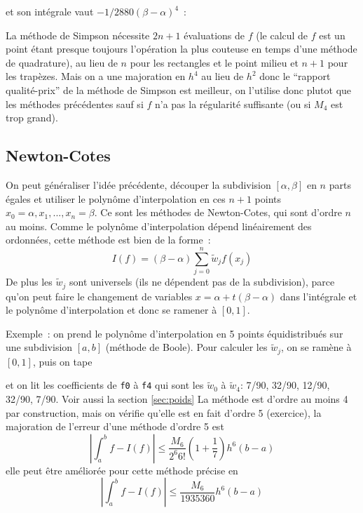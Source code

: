 \documentclass[a4paper,11pt]{article}
\begin{document}
\begin{giacjshere}
et son int\'egrale vaut $-1/2880(\beta-\alpha)^4$~:\\

La m\'ethode de Simpson n\'ecessite $2n+1$ \'evaluations de $f$ (le calcul
de $f$ est un point \'etant presque toujours 
l'op\'eration la plus couteuse en temps d'une
m\'ethode de quadrature), au lieu de $n$ pour les rectangles
et le point milieu et $n+1$ pour les trap\`ezes. Mais on a une majoration
en $h^4$ au lieu de $h^2$ donc le ``rapport qualit\'e-prix'' de la m\'ethode
de Simpson est meilleur, on l'utilise donc plutot que les
m\'ethodes pr\'ec\'edentes sauf si $f$ n'a pas la r\'egularit\'e
suffisante (ou si $M_4$ est trop grand).

 \subsection{Newton-Cotes} 
On peut g\'en\'eraliser l'id\'ee pr\'ec\'edente, d\'ecouper la subdivision 
$[\alpha,\beta]$ en $n$ parts \'egales et utiliser le polynôme d'interpolation
en ces $n+1$ points $x_0=\alpha, x_1, ..., x_n=\beta$. 
Ce sont les m\'ethodes de Newton-Cotes,
qui sont d'ordre $n$ au moins. Comme le polyn\^ome d'interpolation
d\'epend lin\'eairement des ordonn\'ees, cette m\'ethode est bien
de la forme~:
\[ I(f)=(\beta-\alpha)\sum_{j=0}^n \tilde{w}_j f(x_j)\]
De plus les $\tilde{w}_j$ sont universels (ils ne d\'ependent pas de 
la subdivision), parce qu'on peut faire 
le changement de variables $x=\alpha+t(\beta-\alpha)$ dans l'int\'egrale
et le polyn\^ome d'interpolation et donc se ramener \`a $[0,1]$.

Exemple~: on prend le polyn\^ome d'interpolation en 5 points 
\'equidistribu\'es sur une subdivision $[a,b]$ (m\'ethode de Boole). 
Pour calculer les
$\tilde{w}_j$, on se ram\`ene \`a $[0,1]$, puis on tape
\begin{center}
\end{center}
et on lit les coefficients de \verb|f0| \`a \verb|f4|
qui sont les $\tilde{w}_0$ \`a  $\tilde{w}_4$: 7/90, 32/90, 12/90,
32/90, 7/90. Voir aussi la section \ref{sec:poids}
La m\'ethode est d'ordre au moins 4 par construction, mais on v\'erifie
qu'elle est en fait d'ordre 5 (exercice), la majoration de l'erreur
d'une m\'ethode d'ordre 5 est 
\[ |\int_a^b f -I(f)| \leq \frac{M_6}{2^6 6!}(1+\frac{1}{7}) h^6 (b-a) \]
elle peut \^etre am\'elior\'ee pour cette m\'ethode pr\'ecise en
\[ |\int_a^b f -I(f)| \leq \frac{M_6}{1935360} h^6 (b-a) \]


\end{giacjshere}
\end{document}
